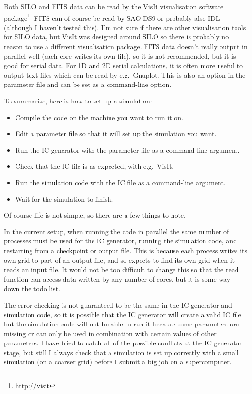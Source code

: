 \documentclass[a4paper,11pt]{report}
\begin{document}
Both SILO and FITS data can be read by the VisIt visualisation software package\footnote{\url{http://visit}}.
FITS can of course be read by SAO-DS9 or probably also IDL (although I haven't tested this).
I'm not sure if there are other visualisation tools for SILO data, but VisIt was designed around SILO so there is probably no reason to use a different visualisation package.
FITS data doesn't really output in parallel well (each core writes its own file), so it is not recommended, but it is good for serial data.
For 1D and 2D serial calculations, it is often more useful to output text files which can be read by e.g.\ Gnuplot.
This is also an option in the parameter file and can be set as a command-line option.

To summarise, here is how to set up a simulation:
\begin{itemize}
\item Compile the code on the machine you want to run it on.
\item Edit a parameter file so that it will set up the simulation you want.
\item Run the IC generator with the parameter file as a command-line argument.
\item Check that the IC file is as expected, with e.g.\ VisIt.
\item Run the simulation code with the IC file as a command-line argument.
\item Wait for the simulation to finish.
\end{itemize}

Of course life is not simple, so there are a few things to note.

In the current setup, when running the code in parallel the same number of processes must be used for the IC generator, running the simulation code, and restarting from a checkpoint or output file.
This is because each process writes its own grid to part of an output file, and so expects to find its own grid when it reads an input file.
It would not be too difficult to change this so that the read function can access data written by any number of cores, but it is some way down the todo list.

The error checking is not guaranteed to be the same in the IC generator and simulation code, so it is possible that the IC generator will create a valid IC file but the simulation code will not be able to run it because some parameters are missing or can only be used in combination with certain values of other parameters.
I have tried to catch all of the possible conflicts at the IC generator stage, but still I always check that a simulation is set up correctly with a small simulation (on a coarser grid) before I submit a big job on a supercomputer.
\end{document}
